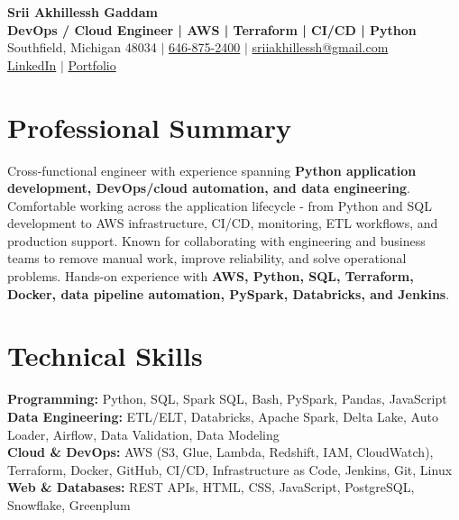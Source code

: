 \documentclass[letterpaper,10pt]{article}
\begin{document}
\fontsize{9.35pt}{10.45pt}\selectfont

\begin{center}
    {\LARGE \textbf{Srii Akhillessh Gaddam}} \\[-1pt]
    \textbf{DevOps / Cloud Engineer | AWS | Terraform | CI/CD | Python} \\[2pt]
    Southfield, Michigan 48034 $|$
    \href{tel:6468752400}{646-875-2400} $|$
    \href{mailto:sriiakhillessh@gmail.com}{sriiakhillessh@gmail.com} \\[1pt]
    \href{https://www.linkedin.com/in/srii-akhiilessh-gaddam-b48668191/}{LinkedIn} $|$
    \href{https://sriiakhillesshg.github.io/portfolio/}{Portfolio}
\end{center}
\vspace{-8pt}

\section{Professional Summary}
\small{Cross-functional engineer with experience spanning \textbf{Python application development, DevOps/cloud automation, and data engineering}. Comfortable working across the application lifecycle - from Python and SQL development to AWS infrastructure, CI/CD, monitoring, ETL workflows, and production support. Known for collaborating with engineering and business teams to remove manual work, improve reliability, and solve operational problems. Hands-on experience with \textbf{AWS, Python, SQL, Terraform, Docker, data pipeline automation, PySpark, Databricks, and Jenkins}.}

\section{Technical Skills}
\small{
\textbf{Programming:} Python, SQL, Spark SQL, Bash, PySpark, Pandas, JavaScript \\
\textbf{Data Engineering:} ETL/ELT, Databricks, Apache Spark, Delta Lake, Auto Loader, Airflow, Data Validation, Data Modeling \\
\textbf{Cloud \& DevOps:} AWS (S3, Glue, Lambda, Redshift, IAM, CloudWatch), Terraform, Docker, GitHub, CI/CD, Infrastructure as Code, Jenkins, Git, Linux \\
\textbf{Web \& Databases:} REST APIs, HTML, CSS, JavaScript, PostgreSQL, Snowflake, Greenplum
}
\end{document}
